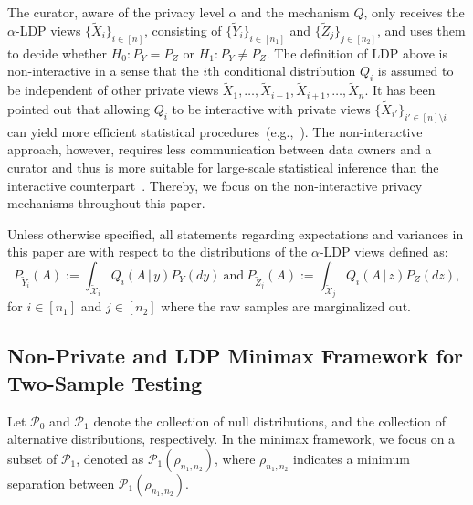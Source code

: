 \documentclass[twoside,11pt]{article}
\newcommand{\distClassGeneric}{\mathcal{P}}
\newcommand{\minSep}{\rho} %
\newcommand{\rvX}{X} %
\newcommand{\rvXCodomain}{\mathcal{\rvX}} %
\newcommand{\rvXPrivCodomain}{\tilde{\rvXCodomain}}
\newcommand{\rvY}{Y}
\newcommand{\rvYPriv}{\tilde{\rvY}} %
\newcommand{\rvZ}{Z}
\newcommand{\rvZPriv}{\tilde{\rvZ}} %
\newcommand{\sampleIndexOne}{i}
\newcommand{\sampleIndexTwo}{j}
\newcommand{\sampleSets}[3]{\{{#1}_{#2}\}_{#2 \in [#3]}}
\newcommand{\sampleSize}{n}
\newcommand{\privacyParameter}{\alpha} %
\begin{document}
\noindent
The curator, aware of the privacy level $\alpha$ and the  mechanism $Q$, only receives the $\privacyParameter$-LDP views $\{\tilde{X}_i\}_{i \in [n]}$, consisting of $\sampleSets{\rvYPriv}{\sampleIndexOne}{\sampleSize_1}$ and $\sampleSets{\rvZPriv}{\sampleIndexTwo}{\sampleSize_2}$, and uses them to decide whether $H_0: P_\rvY = P_\rvZ$  or $H_1: P_\rvY \neq P_\rvZ$.
The definition of LDP above is non-interactive in a sense that the $\sampleIndexOne$th conditional distribution $Q_\sampleIndexOne$ is assumed to be independent of other private views $\tilde{X}_1,\ldots,\tilde{X}_{i-1},\tilde{X}_{i+1},\ldots,\tilde{X}_n$.
It has been pointed out that allowing $Q_i$ to be interactive with private views $\{ \tilde{X}_{i'} \}_{i' \in [\sampleSize]\setminus{i}}$ can yield more efficient statistical procedures~(e.g.,~\cite{Acharya2022InteractiveConstraints,Berrett2020Interactive, Kasiviswanathan2008WhatPrivately}).
The non-interactive approach, however, requires less communication between data owners and a curator and thus is more suitable for large-scale statistical inference than the interactive counterpart~\citep{Berret2021Classification, Joseph2019Interactivity}. Thereby, we focus on the non-interactive privacy mechanisms throughout this paper.

Unless otherwise specified, all statements regarding expectations and variances in this paper are with respect to the distributions of the $\privacyParameter$-LDP views defined as:
\begin{equation*}
	P_{ \tilde{Y}_{i}}(A) := \int_{\rvXPrivCodomain_i}
	Q_\sampleIndexOne
	(
	A\,|\,
	y
	)
	P_Y(dy)~\text{and}~
	P_{ \tilde{Z}_{j}}(A) := \int_{\rvXPrivCodomain_j}
	Q_\sampleIndexOne
	(
	A\,|\,
	z
	)
	P_Z(dz),
\end{equation*}
for $i \in [n_1]$ and $j \in [n_2]$ where the raw samples are marginalized out.

\subsection{Non-Private and LDP Minimax Framework for Two-Sample Testing}\label{subsection:testing}
Let $\distClassGeneric_0$ and $\distClassGeneric_1$ denote the collection of null distributions, and the collection of alternative distributions, respectively. In the minimax framework, we focus on a subset of $\distClassGeneric_1$, denoted as $\distClassGeneric_1(\minSep_{\sampleSize_1, \sampleSize_2})$, where $\minSep_{\sampleSize_1, \sampleSize_2}$ indicates a minimum separation between $\distClassGeneric_1(\minSep_{\sampleSize_1, \sampleSize_2})$. 
\end{document}
